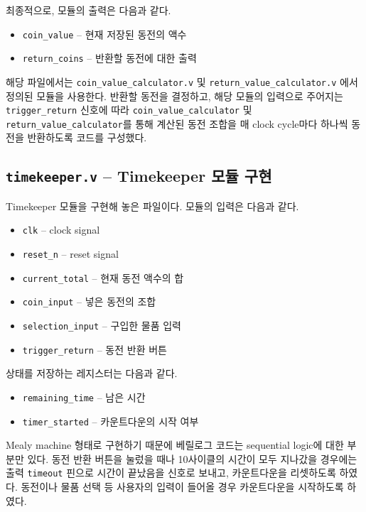 \documentclass{scrartcl}
\begin{document}
최종적으로, 모듈의 출력은 다음과 같다.

\begin{itemize}
  \item \texttt{coin\_value} -- 현재 저장된 동전의 액수
  \item \texttt{return\_coins} -- 반환할 동전에 대한 출력
\end{itemize}

해당 파일에서는 \texttt{coin\_value\_calculator.v} 및 \texttt{return\_value\_calculator.v} 에서 정의된 모듈을 사용한다.
반환할 동전을 결정하고, 해당 모듈의 입력으로 주어지는 \texttt{trigger\_return} 신호에 따라 \texttt{coin\_value\_calculator} 및
\texttt{return\_value\_calculator}를 통해 계산된 동전 조합을 매 clock cycle마다 하나씩 동전을 반환하도록 코드를 구성했다.

\subsection{\texttt{timekeeper.v} -- Timekeeper 모듈 구현}
Timekeeper 모듈을 구현해 놓은 파일이다. 모듈의 입력은 다음과 같다.

\begin{itemize}
  \item \texttt{clk} -- clock signal
  \item \texttt{reset\_n} -- reset signal
  \item \texttt{current\_total} -- 현재 동전 액수의 합
  \item \texttt{coin\_input} -- 넣은 동전의 조합
  \item \texttt{selection\_input} -- 구입한 물품 입력
  \item \texttt{trigger\_return} -- 동전 반환 버튼
\end{itemize}

상태를 저장하는 레지스터는 다음과 같다.

\begin{itemize}
  \item \texttt{remaining\_time} -- 남은 시간
  \item \texttt{timer\_started} -- 카운트다운의 시작 여부
\end{itemize}

Mealy machine 형태로 구현하기 때문에 베릴로그 코드는 sequential logic에 대한 부분만 있다. 동전 반환 버튼을 눌렀을
때나 10사이클의 시간이 모두 지나갔을 경우에는 출력 \texttt{timeout} 핀으로 시간이 끝났음을 신호로 보내고, 카운트다운을
리셋하도록 하였다. 동전이나 물품 선택 등 사용자의 입력이 들어올 경우 카운트다운을 시작하도록 하였다.
\end{document}
